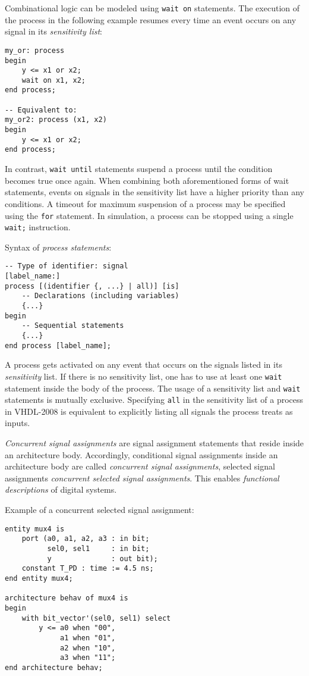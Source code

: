 \documentclass[fontsize=11pt,a4paper]{scrartcl}
\begin{document}
Combinational logic can be modeled using \lstinline!wait on! statements. The execution of the process in the following example resumes every time an event occurs on any signal in its \emph{sensitivity list}:
\begin{lstlisting}
my_or: process
begin
	y <= x1 or x2;
	wait on x1, x2;
end process;

-- Equivalent to:
my_or2: process (x1, x2)
begin
	y <= x1 or x2;
end process;
\end{lstlisting}

In contrast, \lstinline!wait until! statements suspend a process until the condition becomes true once again. When combining both aforementioned forms of wait statements, events on signals in the sensitivity list have a higher priority than any conditions. A timeout for maximum suspension of a process may be specified using the \lstinline!for! statement. In simulation, a process can be stopped using a single \lstinline!wait;! instruction.

Syntax of \emph{process statements}:
\begin{lstlisting}
-- Type of identifier: signal
[label_name:]
process [(identifier {, ...} | all)] [is]
	-- Declarations (including variables)
	{...}
begin
	-- Sequential statements
	{...}
end process [label_name];
\end{lstlisting}

A process gets activated on any event that occurs on the signals listed in its \emph{sensitivity} list. If there is no sensitivity list, one has to use at least one \lstinline!wait! statement inside the body of the process. The usage of a sensitivity list and \lstinline!wait! statements is mutually exclusive. Specifying \lstinline!all! in the sensitivity list of a process in VHDL-2008 is equivalent to explicitly listing all signals the process treats as inputs.

\emph{Concurrent signal assignments} are signal assignment statements that reside inside an architecture body. Accordingly, conditional signal assignments inside an architecture body are called \emph{concurrent signal assignments}, selected signal assignments \emph{concurrent selected signal assignments}. This enables \emph{functional descriptions} of digital systems.

Example of a concurrent selected signal assignment:
\begin{lstlisting}
entity mux4 is
	port (a0, a1, a2, a3 : in bit;
	      sel0, sel1     : in bit;
	      y              : out bit);
	constant T_PD : time := 4.5 ns;
end entity mux4;

architecture behav of mux4 is
begin
	with bit_vector'(sel0, sel1) select
		y <= a0 when "00",
		     a1 when "01",
		     a2 when "10",
		     a3 when "11";
end architecture behav;
\end{lstlisting}
\end{document}
